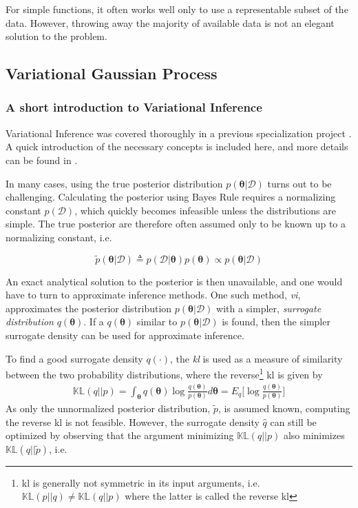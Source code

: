 For simple functions, it often works well only to use a representable subset of the data. However, throwing away the majority of available data is not an elegant solution to the problem. 
\subsection{Variational Gaussian Process}

\subsubsection{A short introduction to Variational Inference}
Variational Inference was covered thoroughly in a previous specialization project \cite{mellbye}. A quick introduction of the necessary concepts is included here, and more details can be found in \cite{mellbye, murphy}.

In many cases, using the true posterior distribution $p(\boldsymbol{\theta} | \mathcal{D})$ turns out to be challenging. Calculating the posterior using Bayes Rule requires a normalizing constant $p(\mathcal{D})$, which quickly becomes infeasible unless the distributions are simple. The true posterior are therefore often assumed only to be known up to a normalizing constant, i.e.

\begin{equation}
    \tilde{p}(\boldsymbol{\theta} | \mathcal{D}) \triangleq p(\mathcal{D} | \boldsymbol{\theta})p(\boldsymbol{\theta}) \propto p(\boldsymbol{\theta} | \mathcal{D})
\end{equation}

An exact analytical solution to the posterior is then unavailable, and one would have to turn to approximate inference methods. 
One such method, \textit{\acrfull{vi}}, approximates the posterior distribution $p(\boldsymbol{\theta} | \mathcal{D})$ with a simpler, \textit{surrogate distribution} $q(\boldsymbol{\theta})$. If a $q(\boldsymbol{\theta})$ similar to $p(\boldsymbol{\theta} | \mathcal{D})$ is found, then the simpler surrogate density can be used for approximate inference.

To find a good surrogate density $q(\cdot)$, the \textit{\acrfull{kl}} is used as a measure of similarity between the two probability distributions, where the reverse\footnote{\acrshort{kl} is generally not symmetric in its input arguments, i.e. $\mathbb{KL}(p || q) \neq \mathbb{KL}(q || p)$ where the latter is called the reverse \acrshort{kl}} \acrshort{kl} is given by
\begin{align}
    \mathbb{KL}(q || p) = \int_{\boldsymbol{\theta}} q(\boldsymbol{\theta}) \log \frac{q(\boldsymbol{\theta})}{p(\boldsymbol{\theta})} d\boldsymbol{\theta} = E_{q} \big[ \log \frac{q(\boldsymbol{\theta})}{p(\boldsymbol{\theta})} \big]\label{eq:kl_qp}
\end{align}
As only the unnormalized posterior distribution, $\tilde{p}$, is assumed known, computing the reverse \acrshort{kl} is not feasible. However, the surrogate density $\hat{q}$ can still be optimized by observing that the argument minimizing $\mathbb{KL}(q || p)$ also minimizes $\mathbb{KL}(q || \tilde{p})$, i.e.

